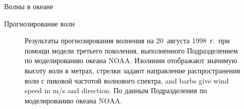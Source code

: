\begin{chapter}{Волны в океане}
\begin{section}{Прогнозирование волн}
\begin{figure} [t!]
\caption{Результаты прогнозирования волнения на 20~августа 1998~г.\
при помощи модели третьего поколения, выполненного Подразделением по
моделированию океана NOAA. Изолинии отображают значимую высоту волн в метрах,
стрелки задают направление распространения волн с пиковой частотой волнового
спектра,  
and barbs give wind speed in m/s and direction. 
По данным Подразделения по моделированию океана NOAA.}
\label{fig:noaa.waves}
\end{figure}
%
\end{section}


\end{chapter}
